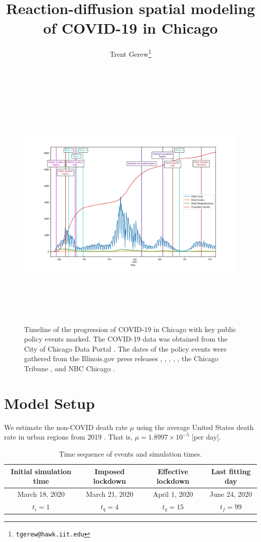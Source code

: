 \documentclass[11pt]{article}
\title{Reaction-diffusion spatial modeling of COVID-19 in Chicago}
\author{Trent Gerew\thanks{\texttt{tgerew@hawk.iit.edu}}}
\institute{Department of Applied Mathematics, Illinois Institute of Technology, Chicago, Illinois}
\begin{document}
\maketitle

	\begin{figure}[h]
		\centering
		\includegraphics[height=12cm]{chicago-data}
		\label{fig:data}
		\caption{Timeline of the progression of COVID-19 in Chicago with key public policy events marked.
			The COVID-19 data was obtained from the City of Chicago Data Portal \cite{Chicago-cases}.
			The dates of the policy events were gathered from the Illinois.gov press releases \cite{phase-5}, \cite{mask-lift}, \cite{full-vax}, \cite{start-vax}, \cite{phase-4}, the Chicago Tribune \cite{phase-3}, and NBC Chicago \cite{phase-2}.}
	\end{figure}

\section{Model Setup}
	We estimate the non-COVID death rate $\mu$ using the average United States death rate in urban regions from 2019 \cite{death-trends}.
	That is, $\mu = 1.8997 \times 10^{-5}$ [per day].
	
	\begin{table}[h]
		\centering
		\caption{Time sequence of events and simulation times.}
		\label{tab:times}
		\begin{tabular}{ c c c c }
			\hline
			\hline
			Initial simulation time	&	Imposed lockdown	&	Effective lockdown	&	Last fitting day	\\
			\hline
			March 18, 2020	&	March 21, 2020	&	 April 1, 2020	&	June 24, 2020	\\
			$t_i = 1$	&	$t_q = 4$	&	$t_q = 15$	&	$t_f = 99$ \\
			\hline
			\hline
		\end{tabular}
	\end{table}
	
\end{document}
